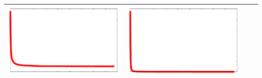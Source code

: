 \documentclass[a4paper]{article}
\begin{document}
\begin{center}
\begin{tabular}{cccc}
    \includegraphics[width=0.23\columnwidth]{flin2-n.pdf} &
    \includegraphics[width=0.23\columnwidth]{flin2-n2.pdf} \\
    \bottomrule
  \end{tabular}
\end{center}
\end{document}
